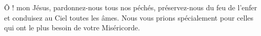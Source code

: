 Ô ! mon Jésus, pardonnez-nous tous nos péchés, préservez-nous du feu de l’enfer et conduisez au Ciel toutes les âmes. Nous vous prions spécialement pour celles qui ont le plus besoin de votre Miséricorde.